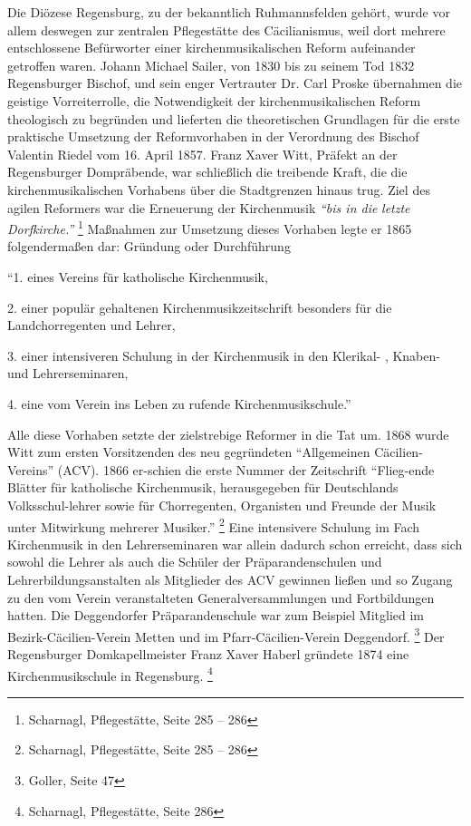 \documentclass[a4paper]{article}
\newcommand\textstyleZitate[1]{\textit{#1}}
\begin{document}
Die Diözese Regensburg, zu der bekanntlich Ruhmannsfelden gehört, wurde
vor allem deswegen zur zentralen Pflegestätte des Cäcilianismus, weil
dort mehrere entschlossene Befürworter einer kirchenmusikalischen
Reform aufeinander getroffen waren. Johann Michael Sailer, von 1830 bis
zu seinem Tod 1832 Regensburger Bischof, und sein enger Vertrauter Dr.
Carl Proske übernahmen die geistige Vorreiterrolle, die Notwendigkeit
der kirchenmusikalischen Reform theologisch zu begründen und lieferten
die theoretischen Grundlagen für die erste praktische Umsetzung der
Reformvorhaben in der Verordnung des Bischof Valentin Riedel vom 16.
April 1857. Franz Xaver Witt, Präfekt an der Regensburger Dompräbende,
war schließlich die treibende Kraft, die die kirchenmusikalischen
Vorhabens über die Stadtgrenzen hinaus trug. Ziel des agilen Reformers
war die Erneuerung der Kirchenmusik \textstyleZitate{“bis in die
}\textstyleZitate{letzte Dorfkirche.” } \footnote{Scharnagl,
Pflegestätte, Seite 285 – 286} Maßnahmen zur Umsetzung dieses Vorhaben
legte er 1865 folgendermaßen dar: Gründung oder Durchführung

“1. eines Vereins für katholische Kirchenmusik,

2. einer populär gehaltenen Kirchenmusikzeitschrift besonders für die
Landchorregenten und Lehrer,

3. einer intensiveren Schulung in der Kirchenmusik in den Klerikal- ,
Knaben- und Lehrerseminaren,

4. eine vom Verein ins Leben zu rufende Kirchenmusikschule.”

Alle diese Vorhaben setzte der zielstrebige Reformer in die Tat um. 1868
wurde Witt zum ersten Vorsitzenden des neu gegründeten “Allgemeinen
Cäcilien-Vereins” (ACV). 1866 er-schien die erste Nummer der
Zeitschrift “Flieg-ende Blätter für katholische Kirchenmusik,
herausgegeben für Deutschlands Volksschul-lehrer sowie für
Chorregenten, Organisten und Freunde der Musik unter Mitwirkung
mehrerer Musiker.” \footnote{Scharnagl, Pflegestätte, Seite 285 – 286}
Eine intensivere Schulung im Fach Kirchenmusik in den Lehrerseminaren
war allein dadurch schon erreicht, dass sich sowohl die Lehrer als auch
die Schüler der Präparandenschulen und Lehrerbildungsanstalten als
Mitglieder des ACV gewinnen ließen und so Zugang zu den vom Verein
veranstalteten Generalversammlungen und Fortbildungen hatten. Die
Deggendorfer Präparandenschule war zum Beispiel Mitglied im
Bezirk-Cäcilien-Verein Metten und im Pfarr-Cäcilien-Verein
Deggendorf. \footnote{Goller, Seite 47} Der Regensburger
Domkapellmeister Franz Xaver Haberl gründete 1874 eine
Kirchenmusikschule in Regensburg. \footnote{Scharnagl, Pflegestätte,
Seite 286}
\end{document}
